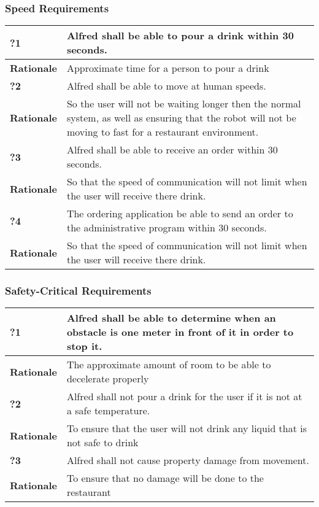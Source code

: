 \documentclass [11pt]{article}
\begin{document}
\subsubsection{Speed Requirements }

	\begin{longtable}{| p{ } | p{ } | }\hline 
			\rowcolor{tableCell}\textbf{?1} & Alfred shall be able to pour a drink within 30 seconds. \\ \hline
			\textbf{Rationale} & Approximate time for a person to pour a drink\\ \hline 
			\rowcolor{tableCell}\textbf{?2} & Alfred shall be able to move at human speeds. \\ \hline
			\textbf{Rationale} & So the user will not be waiting longer then the normal system, as well as ensuring that the robot will not be moving to fast for a restaurant environment.\\ \hline 
			\rowcolor{tableCell}\textbf{?3} &  Alfred shall be able to receive an order within 30 seconds. \\ \hline
			\textbf{Rationale} & So that the speed of communication will not limit when the user will receive there drink.\\ \hline
			\rowcolor{tableCell}\textbf{?4} &  The ordering application be able to send an order to the administrative program within 30 seconds. \\ \hline
			\textbf{Rationale} & So that the speed of communication will not limit when the user will receive there drink.\\ \hline
	\end{longtable}
	

\subsubsection{Safety-Critical Requirements }

\begin{longtable}{| p{ } | p{ } | }\hline 
	\rowcolor{tableCell}\textbf{?1} &  Alfred shall be able to determine when an obstacle is one meter in front of it in order to stop it. \\ \hline
	\textbf{Rationale} & The approximate amount of room to be able to decelerate properly\\ \hline 
	\rowcolor{tableCell}\textbf{?2} & Alfred shall not pour a drink for the user if it is not at a safe temperature. \\ \hline
	\textbf{Rationale} & To ensure that the user will not drink any liquid that is not safe to drink\\ \hline 
	\rowcolor{tableCell}\textbf{?3} & Alfred shall not cause property damage from movement. \\ \hline
	\textbf{Rationale} & To ensure that no damage will be done to the restaurant\\ \hline 
\end{longtable}
\end{document}
